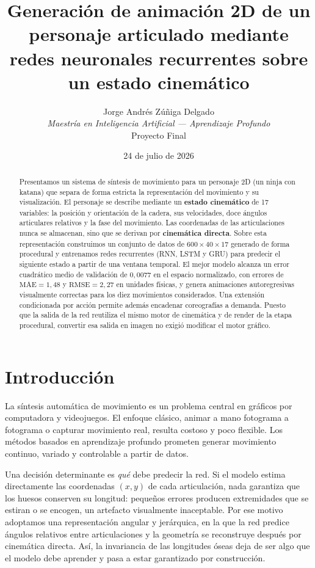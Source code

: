 \documentclass[10pt,twocolumn]{article}
\title{\vspace{-1.2cm}\textbf{Generación de animación 2D de un personaje
articulado mediante redes neuronales recurrentes sobre un estado cinemático}}
\author{
  Jorge Andrés Zúñiga Delgado\\
  \textit{Maestría en Inteligencia Artificial --- Aprendizaje Profundo}\\
  Proyecto Final
}
\date{24 de julio de 2026}
\begin{document}
\maketitle

\begin{abstract}
\noindent
Presentamos un sistema de síntesis de movimiento para un personaje 2D (un ninja
con katana) que separa de forma estricta la representación del movimiento y su
visualización. El personaje se describe mediante un \textbf{estado cinemático} de
17 variables: la posición y orientación de la cadera, sus velocidades, doce
ángulos articulares relativos y la fase del movimiento. Las coordenadas de las
articulaciones nunca se almacenan, sino que se derivan por \textbf{cinemática
directa}. Sobre esta representación construimos un conjunto de datos de
$600\times40\times17$ generado de forma procedural y entrenamos redes recurrentes
(RNN, LSTM y GRU) para predecir el siguiente estado a partir de una ventana
temporal. El mejor modelo alcanza un error cuadrático medio de validación de
$0{,}0077$ en el espacio normalizado, con errores de $\mathrm{MAE}=1{,}48$ y
$\mathrm{RMSE}=2{,}27$ en unidades físicas, y genera animaciones autoregresivas
visualmente correctas para los diez movimientos considerados. Una extensión
condicionada por acción permite además encadenar coreografías a demanda. Puesto
que la salida de la red reutiliza el mismo motor de cinemática y de render de la
etapa procedural, convertir esa salida en imagen no exigió modificar el motor
gráfico.
\end{abstract}

\section{Introducción}
La síntesis automática de movimiento es un problema central en gráficos por
computadora y videojuegos. El enfoque clásico, animar a mano fotograma a
fotograma o capturar movimiento real, resulta costoso y poco flexible. Los
métodos basados en aprendizaje profundo prometen generar movimiento continuo,
variado y controlable a partir de datos.

Una decisión determinante es \emph{qué} debe predecir la red. Si el modelo estima
directamente las coordenadas $(x,y)$ de cada articulación, nada garantiza que los
huesos conserven su longitud: pequeños errores producen extremidades que se
estiran o se encogen, un artefacto visualmente inaceptable. Por ese motivo
adoptamos una representación angular y jerárquica, en la que la red predice
ángulos relativos entre articulaciones y la geometría se reconstruye después por
cinemática directa. Así, la invariancia de las longitudes óseas deja de ser algo
que el modelo debe aprender y pasa a estar garantizado por construcción.
\end{document}
